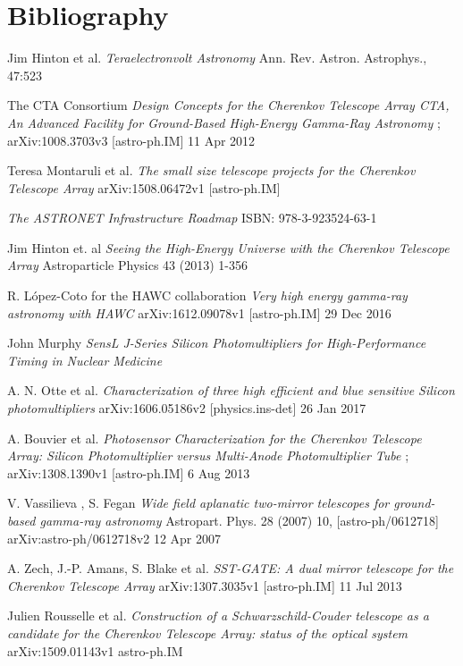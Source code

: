 \documentclass[12pt,article,type=msc,colorback,accentcolor=tud9c]{tudthesis}
\begin{document}
\section{\Large Bibliography}
\begin{thebibliography}{12}

 Jim Hinton et al. \textit{Teraelectronvolt Astronomy} Ann. Rev. Astron. Astrophys., 47:523

 The CTA Consortium \textit{Design Concepts for the Cherenkov Telescope Array CTA, An Advanced Facility for Ground-Based High-Energy Gamma-Ray Astronomy} ; arXiv:1008.3703v3 [astro-ph.IM] 11 Apr 2012

 Teresa Montaruli et al. \textit{The small size telescope projects for the Cherenkov Telescope Array} arXiv:1508.06472v1 [astro-ph.IM]

 \textit{The ASTRONET Infrastructure Roadmap} ISBN: 978-3-923524-63-1

 Jim Hinton et. al \textit{Seeing the High-Energy Universe with the Cherenkov Telescope Array} Astroparticle Physics 43 (2013) 1-356 

 R. L\'opez-Coto for the HAWC collaboration \textit{Very high energy gamma-ray astronomy with HAWC} arXiv:1612.09078v1 [astro-ph.IM] 29 Dec 2016

 John Murphy \textit{SensL J-Series Silicon Photomultipliers for High-Performance Timing in Nuclear Medicine}

 A. N. Otte et al. \textit{Characterization of three high efficient and blue sensitive Silicon photomultipliers} arXiv:1606.05186v2 [physics.ins-det] 26 Jan 2017

  A. Bouvier et al. \textit{Photosensor Characterization for the Cherenkov Telescope Array: Silicon Photomultiplier versus Multi-Anode Photomultiplier Tube} ; arXiv:1308.1390v1 [astro-ph.IM] 6 Aug 2013

 V. Vassilieva , S. Fegan \textit{Wide field aplanatic two-mirror telescopes for ground-based gamma-ray astronomy} Astropart. Phys. 28 (2007) 10, [astro-ph/0612718] arXiv:astro-ph/0612718v2 12 Apr 2007

 A. Zech, J.-P. Amans, S. Blake et al. \textit{SST-GATE: A dual mirror telescope for the Cherenkov Telescope Array} arXiv:1307.3035v1 [astro-ph.IM] 11 Jul 2013

 Julien Rousselle et al. \textit{Construction of a Schwarzschild-Couder telescope as a candidate for the Cherenkov Telescope Array: status of the optical system}  arXiv:1509.01143v1 astro-ph.IM


\end{thebibliography}
\end{document}

